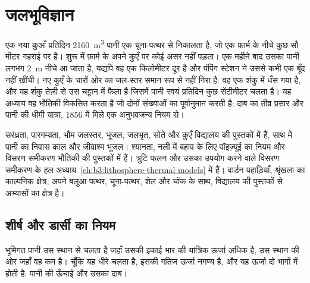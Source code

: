 \chapter{जलभूविज्ञान}\label{ch:b3:hydrogeology}

एक नया कुआँ प्रतिदिन \qty{2160}{m^3} पानी एक चूना-पत्थर से निकालता है, जो
एक फ़ार्म के नीचे कुछ सौ मीटर गहराई पर है। शुरू में फ़ार्म के अपने कुएँ पर कोई असर नहीं पड़ता।
एक महीने बाद उसका पानी लगभग \qty{2}{m} नीचे आ जाता है, यद्यपि
वह एक किलोमीटर दूर है और पंपिंग स्टेशन ने उससे कभी एक बूँद नहीं खींची। नए कुएँ के
चारों ओर का जल-स्तर समान रूप से नहीं गिरा है: वह एक
शंकु में धँस गया है, और यह शंकु तेज़ी से उस चट्टान में फैला है जिसमें पानी
स्वयं प्रतिदिन कुछ सेंटीमीटर चलता है। यह अध्याय वह भौतिकी विकसित करता है जो
दोनों संख्याओं का पूर्वानुमान करती है: दाब का तीव्र प्रसार और
पानी की धीमी यात्रा, 1856 में मिले एक अनुभवजन्य नियम से।

\begin{recall}
सरंध्रता, पारगम्यता, भौम जलस्तर, भूजल, जलभृत, सोते
और कुएँ विद्यालय की पुस्तकों में हैं, साथ में पानी का निवास काल और
जीवाश्म भूजल। श्यानता, नली में बहाव के लिए पॉइज़्यूई का नियम
और विसरण समीकरण भौतिकी की पुस्तकों में हैं। त्रुटि फलन
और उसका उपयोग करने वाले विसरण समीकरण के हल
अध्याय~\ref{ch:b3:lithosphere-thermal-models} में हैं। वार्डन पहाड़ियाँ, श्रृंखला का काल्पनिक क्षेत्र,
अपने बलुआ पत्थर, चूना-पत्थर, शेल और चॉक के साथ,
विद्यालय की पुस्तकों से अभ्यासों का क्षेत्र है।
\end{recall}

\section{शीर्ष और डार्सी का नियम}\label{sec:b3:hydrogeology:darcy}

भूमिगत पानी उस स्थान से चलता है जहाँ उसकी इकाई भार की यांत्रिक ऊर्जा अधिक है,
उस स्थान की ओर जहाँ वह कम है। चूँकि यह धीरे चलता है, इसकी गतिज ऊर्जा नगण्य है,
और यह ऊर्जा दो भागों में होती है: पानी की ऊँचाई और उसका
दाब।

